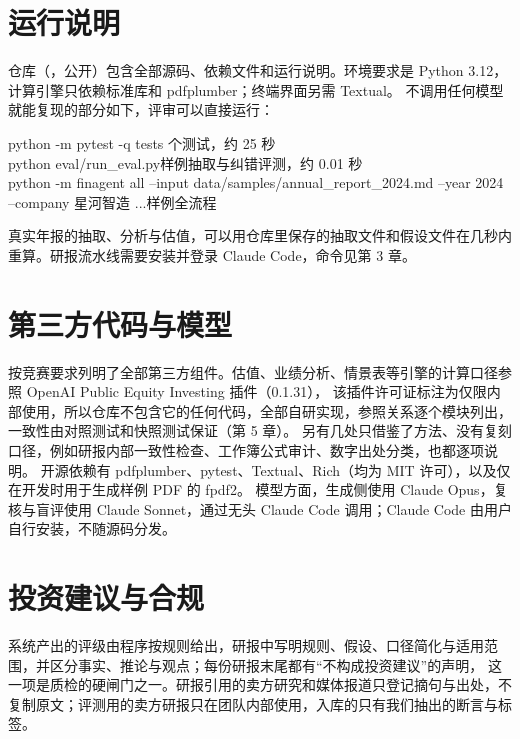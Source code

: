 \section{运行说明}

仓库（\href{https://github.com/MochiaoChen/LEDGER}{}，公开）包含全部源码、依赖文件和运行说明。环境要求是 Python 3.12，计算引擎只依赖标准库和 pdfplumber；终端界面另需 Textual。
不调用任何模型就能复现的部分如下，评审可以直接运行：

\begin{keybox}\small\ttfamily\raggedright
python -m pytest -q tests\hfill \textrm{\small{} 个测试，约 25 秒}\\[2pt]
python eval/run\_eval.py\hfill \textrm{\small\rmfamily 样例抽取与纠错评测，约 0.01 秒}\\[2pt]
python -m finagent all --input data/samples/annual\_report\_2024.md --year 2024 --company 星河智造 ...\hfill \textrm{\small\rmfamily 样例全流程}
\end{keybox}

真实年报的抽取、分析与估值，可以用仓库里保存的抽取文件和假设文件在几秒内重算。研报流水线需要安装并登录 Claude Code，命令见第 3 章。

\section{第三方代码与模型}

 按竞赛要求列明了全部第三方组件。估值、业绩分析、情景表等引擎的计算口径参照 OpenAI Public Equity Investing 插件（0.1.31），
该插件许可证标注为仅限内部使用，所以仓库不包含它的任何代码，全部自研实现，参照关系逐个模块列出，一致性由对照测试和快照测试保证（第 5 章）。
另有几处只借鉴了方法、没有复刻口径，例如研报内部一致性检查、工作簿公式审计、数字出处分类，也都逐项说明。
开源依赖有 pdfplumber、pytest、Textual、Rich（均为 MIT 许可），以及仅在开发时用于生成样例 PDF 的 fpdf2。
模型方面，生成侧使用 Claude Opus，复核与盲评使用 Claude Sonnet，通过无头 Claude Code 调用；Claude Code 由用户自行安装，不随源码分发。

\section{投资建议与合规}

系统产出的评级由程序按规则给出，研报中写明规则、假设、口径简化与适用范围，并区分事实、推论与观点；每份研报末尾都有“不构成投资建议”的声明，
这一项是质检的硬闸门之一。研报引用的卖方研究和媒体报道只登记摘句与出处，不复制原文；评测用的卖方研报只在团队内部使用，入库的只有我们抽出的断言与标签。
